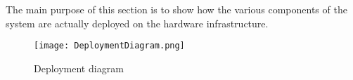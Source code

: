 The main purpose of this section is to show how the various components of the system are actually deployed on the hardware infrastructure.
\begin{figure}[H]
\begin{center}
		\texttt{[image: DeploymentDiagram.png]}
\end{center}
\caption{Deployment diagram}
\end{figure}